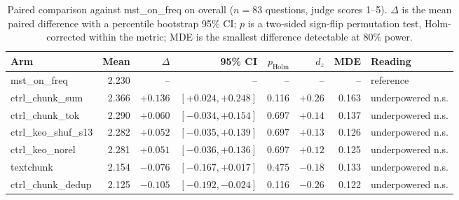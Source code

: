 \begin{table}[t]
\centering
\small
\begin{tabular}{lrrrrrrl}
\toprule
Arm & Mean & $\Delta$ & 95\% CI & $p_{\text{Holm}}$ & $d_z$ & MDE & Reading \\
\midrule
mst\_on\_freq & 2.230 & -- & -- & -- & -- & -- & reference \\
\midrule
ctrl\_chunk\_sum & 2.366 & $+0.136$ & $[+0.024, +0.248]$ & 0.116 & $+0.26$ & 0.163 & underpowered n.s. \\
ctrl\_chunk\_tok & 2.290 & $+0.060$ & $[-0.034, +0.154]$ & 0.697 & $+0.14$ & 0.137 & underpowered n.s. \\
ctrl\_keo\_shuf\_s13 & 2.282 & $+0.052$ & $[-0.035, +0.139]$ & 0.697 & $+0.13$ & 0.126 & underpowered n.s. \\
ctrl\_keo\_norel & 2.281 & $+0.051$ & $[-0.036, +0.136]$ & 0.697 & $+0.12$ & 0.125 & underpowered n.s. \\
textchunk & 2.154 & $-0.076$ & $[-0.167, +0.017]$ & 0.475 & $-0.18$ & 0.133 & underpowered n.s. \\
ctrl\_chunk\_dedup & 2.125 & $-0.105$ & $[-0.192, -0.024]$ & 0.116 & $-0.26$ & 0.122 & underpowered n.s. \\
\bottomrule
\end{tabular}
\caption{Paired comparison against mst\_on\_freq on overall ($n=83$ questions, judge scores 1--5). $\Delta$ is the mean paired difference with a percentile bootstrap 95\% CI; $p$ is a two-sided sign-flip permutation test, Holm-corrected within the metric; MDE is the smallest difference detectable at 80\% power.}
\label{tab:paired-overall}
\end{table}
